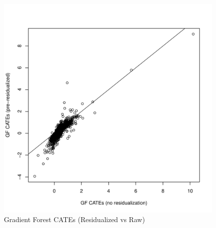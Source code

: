 \documentclass{article}
\begin{document}
\begin{figure}[!ht]
\center
\caption{Gradient Forest CATEs (Residualized vs Raw)}
\label{gfcomp}
\includegraphics[scale=.7]{residGFcomp.pdf}
\end{figure}
\pagebreak
\clearpage
\end{document}
